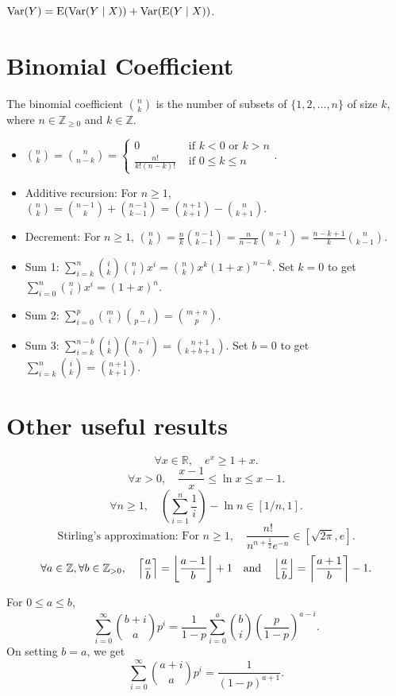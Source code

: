 \documentclass[a4paper, 12pt, fleqn]{article}
\begin{document}
\begin{theorem}
$\operatorname*{Var}(Y) = \operatorname*{E}(\operatorname*{Var}(Y \mid X)) + \operatorname*{Var}(\operatorname*{E}(Y \mid X))$.
\end{theorem}

\section{Binomial Coefficient}

The binomial coefficient $\binom{n}{k}$ is the number of subsets of $\{1, 2, \ldots, n\}$ of size $k$,
where $n \in \mathbb{Z}_{\ge 0}$ and $k \in \mathbb{Z}$.

\begin{itemize}
\item $\displaystyle \binom{n}{k} = \binom{n}{n-k} = \begin{cases}
    0 & \textrm{ if } k < 0 \textrm{ or } k > n
    \\ \frac{n!}{k!(n-k)!} & \textrm{ if } 0 \le k \le n \end{cases}$.
\item Additive recursion: For $n \ge 1$, $\displaystyle \binom{n}{k}
    = \binom{n-1}{k} + \binom{n-1}{k-1}
    = \binom{n+1}{k+1} - \binom{n}{k+1}$.
\item Decrement: For $n \ge 1$, $\displaystyle \binom{n}{k}
    = \frac{n}{k} \binom{n-1}{k-1}
    = \frac{n}{n-k} \binom{n-1}{k}
    = \frac{n-k+1}{k} \binom{n}{k-1}$.
\item Sum 1: $\displaystyle \sum_{i=k}^n \binom{i}{k}\binom{n}{i}x^i = \binom{n}{k}x^k(1+x)^{n-k}$.
Set $k=0$ to get $\displaystyle \sum_{i=0}^n \binom{n}{i}x^i = (1+x)^n$.
\item Sum 2: $\displaystyle \sum_{i=0}^p \binom{m}{i}\binom{n}{p-i} = \binom{m+n}{p}$.
\item Sum 3: $\displaystyle \sum_{i=k}^{n-b} \binom{i}{k}\binom{n-i}{b} = \binom{n+1}{k+b+1}$.
Set $b=0$ to get $\displaystyle \sum_{i=k}^{n} \binom{i}{k} = \binom{n+1}{k+1}$.
\end{itemize}

\section{Other useful results}

\[ \forall x \in \mathbb{R},\quad e^x \ge 1 + x. \]
\[ \forall x > 0, \quad \frac{x-1}{x} \le \ln x \le x-1. \]
\[ \forall n \ge 1, \quad \left(\sum_{i=1}^n \frac{1}{i}\right) - \ln n \in [1/n, 1]. \]
\[ \textrm{Stirling's approximation: For } n \ge 1,\quad
    \frac{n!}{n^{n+\frac{1}{2}}e^{-n}} \in [\sqrt{2\pi}, e]. \]
\[ \forall a \in \mathbb{\mathbb{Z}}, \forall b \in \mathbb{Z}_{>0},\quad
    \left\lceil \frac{a}{b} \right\rceil = \left\lfloor \frac{a-1}{b} \right\rfloor+1 \quad\textrm{and}\quad
    \left\lfloor \frac{a}{b} \right\rfloor = \left\lceil \frac{a+1}{b} \right\rceil-1. \]

\begin{theorem}
For $0 \le a \le b$,
\[ \sum_{i=0}^{\infty} \binom{b+i}{a}p^i
    = \frac{1}{1-p}\sum_{i=0}^a \binom{b}{i}\left(\frac{p}{1-p}\right)^{a-i}. \]
On setting $b = a$, we get
\[ \sum_{i=0}^{\infty} \binom{a+i}{a}p^i = \frac{1}{(1-p)^{a+1}}. \]
\end{theorem}

\end{document}
